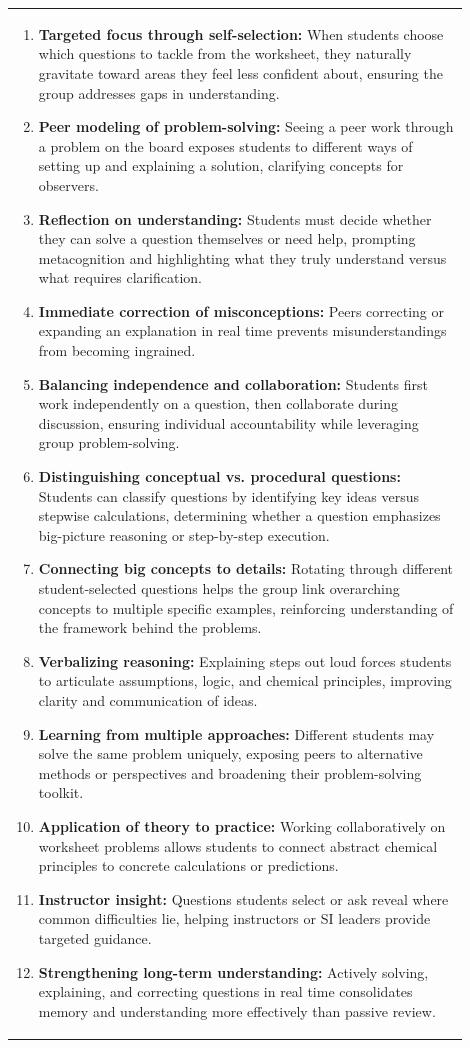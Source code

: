 \documentclass{article}
\begin{document}
{{\begin{tabular}{|p{0.9\linewidth}|}
\begin{enumerate}
    \item \textbf{Targeted focus through self-selection:} When students choose which questions to tackle from the worksheet, they naturally gravitate toward areas they feel less confident about, ensuring the group addresses gaps in understanding.
    \item \textbf{Peer modeling of problem-solving:} Seeing a peer work through a problem on the board exposes students to different ways of setting up and explaining a solution, clarifying concepts for observers.
    \item \textbf{Reflection on understanding:} Students must decide whether they can solve a question themselves or need help, prompting metacognition and highlighting what they truly understand versus what requires clarification.
    \item \textbf{Immediate correction of misconceptions:} Peers correcting or expanding an explanation in real time prevents misunderstandings from becoming ingrained.
    \item \textbf{Balancing independence and collaboration:} Students first work independently on a question, then collaborate during discussion, ensuring individual accountability while leveraging group problem-solving.
    \item \textbf{Distinguishing conceptual vs. procedural questions:} Students can classify questions by identifying key ideas versus stepwise calculations, determining whether a question emphasizes big-picture reasoning or step-by-step execution.
    \item \textbf{Connecting big concepts to details:} Rotating through different student-selected questions helps the group link overarching concepts to multiple specific examples, reinforcing understanding of the framework behind the problems.
    \item \textbf{Verbalizing reasoning:} Explaining steps out loud forces students to articulate assumptions, logic, and chemical principles, improving clarity and communication of ideas.
    \item \textbf{Learning from multiple approaches:} Different students may solve the same problem uniquely, exposing peers to alternative methods or perspectives and broadening their problem-solving toolkit.
    \item \textbf{Application of theory to practice:} Working collaboratively on worksheet problems allows students to connect abstract chemical principles to concrete calculations or predictions.
    \item \textbf{Instructor insight:} Questions students select or ask reveal where common difficulties lie, helping instructors or SI leaders provide targeted guidance.
    \item \textbf{Strengthening long-term understanding:} Actively solving, explaining, and correcting questions in real time consolidates memory and understanding more effectively than passive review.
\end{enumerate}
\hline
\end{tabular}

}}
\end{document}
